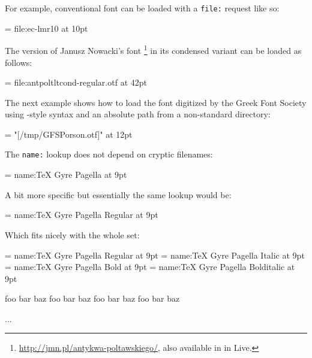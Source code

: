 \endsubsection



For example, conventional  font can be loaded with a \verb|file:|
request like so:

\beginlisting
  \font \lmromanten = {file:ec-lmr10} at 10pt
\endlisting

The \OpenType version of Janusz Nowacki’s font \footnote{%
  \url{http://jmn.pl/antykwa-poltawskiego/}, also available in
  in \TEX Live.
}
in its condensed variant can be loaded as follows:

\beginlisting
  \font \apcregular = file:antpoltltcond-regular.otf at 42pt
\endlisting

The next example shows how to load the  font digitized by
the Greek Font Society using \XETEX-style syntax and an absolute path from a
non-standard directory:

\beginlisting
  \font \gfsporson = "[/tmp/GFSPorson.otf]" at 12pt
\endlisting

\endsubsubsection


The \verb|name:| lookup does not depend on cryptic filenames:

\beginlisting
  \font \pagellaregular = {name:TeX Gyre Pagella} at 9pt
\endlisting

A bit more specific but essentially the same lookup would be:

\beginlisting
  \font \pagellaregular = {name:TeX Gyre Pagella Regular} at 9pt
\endlisting

\noindent
Which fits nicely with the whole set:

\beginlisting
  \font\pagellaregular    = {name:TeX Gyre Pagella Regular}    at 9pt
  \font\pagellaitalic     = {name:TeX Gyre Pagella Italic}     at 9pt
  \font\pagellabold       = {name:TeX Gyre Pagella Bold}       at 9pt
  \font\pagellabolditalic = {name:TeX Gyre Pagella Bolditalic} at 9pt

  {\pagellaregular     foo bar baz\endgraf}
  {\pagellaitalic      foo bar baz\endgraf}
  {\pagellabold        foo bar baz\endgraf}
  {\pagellabolditalic  foo bar baz\endgraf}

  ...
\endlisting

\endsubsubsection


